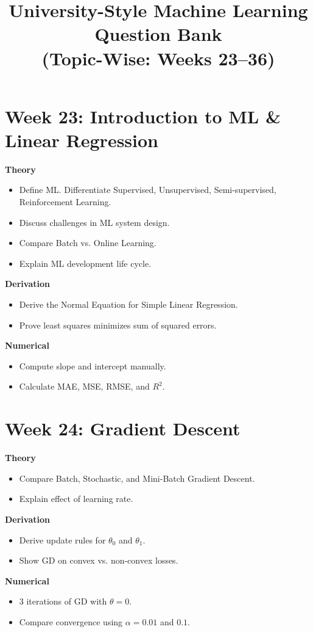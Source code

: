 \documentclass[12pt]{article}
\title{\textbf{University-Style Machine Learning Question Bank}\\\large (Topic-Wise: Weeks 23–36)}
\date{}
\begin{document}
\maketitle

\section*{Week 23: Introduction to ML \& Linear Regression}
\textbf{Theory}
\begin{itemize}
\item Define ML. Differentiate Supervised, Unsupervised, Semi-supervised, Reinforcement Learning.
\item Discuss challenges in ML system design.
\item Compare Batch vs. Online Learning.
\item Explain ML development life cycle.
\end{itemize}

\textbf{Derivation}
\begin{itemize}
\item Derive the Normal Equation for Simple Linear Regression.
\item Prove least squares minimizes sum of squared errors.
\end{itemize}

\textbf{Numerical}
\begin{itemize}
\item Compute slope and intercept manually.
\item Calculate MAE, MSE, RMSE, and $R^2$.
\end{itemize}

\section*{Week 24: Gradient Descent}
\textbf{Theory}
\begin{itemize}
\item Compare Batch, Stochastic, and Mini-Batch Gradient Descent.
\item Explain effect of learning rate.
\end{itemize}

\textbf{Derivation}
\begin{itemize}
\item Derive update rules for $\theta_0$ and $\theta_1$.
\item Show GD on convex vs. non-convex losses.
\end{itemize}

\textbf{Numerical}
\begin{itemize}
\item 3 iterations of GD with $\theta=0$.
\item Compare convergence using $\alpha = 0.01$ and $0.1$.
\end{itemize}
\end{document}
